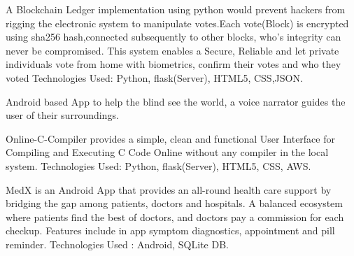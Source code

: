 \documentclass[]{deedy-resume-openfont}
\begin{document}
A Blockchain Ledger implementation using python would prevent hackers from
rigging the electronic system to manipulate votes.Each vote(Block) is encrypted
using sha256 hash,connected subsequently to other blocks, who’s integrity can never
be compromised. This system enables a Secure, Reliable and let private individuals
vote from home with biometrics, confirm their votes and who they voted
\newline Technologies Used: Python, flask(Server), HTML5, CSS,JSON.
\sectionsep

\descript{}
Android based App to help the blind see the world, a voice narrator guides the user
of their surroundings.

\sectionsep
{}
Online-C-Compiler provides a simple, clean and functional User Interface for
Compiling and Executing C Code Online without any compiler in the local system.
Technologies Used: Python, flask(Server), HTML5, CSS, AWS.
\sectionsep

MedX is an Android App that provides an all-round health care support by bridging
the gap among patients, doctors and hospitals. A balanced ecosystem where patients
find the best of doctors, and doctors pay a commission for each checkup. Features
include in app symptom diagnostics, appointment and pill reminder.
Technologies Used : Android, SQLite DB.
\sectionsep
\end{document}
